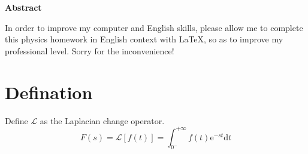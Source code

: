 \documentclass[12pt,a4paper]{article}
\title{\fontsize{18pt}{27pt}\selectfont{\heiti Laplace Transform}}
\author{\fontsize{12pt}{18pt}\selectfont {\fangsong  Sweet Pastry}\\\fontsize{10.5pt}{15.75pt}\selectfont{\fangsong(FDU Physics)}}
\date{}
\begin{document}
	
	\lhead{} 
	\chead{} 
	\rhead{} 
	\lfoot{}
	\cfoot{\thepage} 
	\rfoot{} 
	
	\maketitle
	
	
	
	\begin{center}%
		{\textbf{Abstract}}%
	\end{center}
	\begin{adjustwidth}{1.06cm}{1.06cm}%
		\hspace{1.5em}In order to improve my computer and English skills, please allow me to complete this physics homework in English context with \LaTeX, so as to improve my professional level. Sorry for the inconvenience!
	\end{adjustwidth}
	
	\newpage
	
	\renewcommand{\contentsname}{Contents}
	\tableofcontents
	
	\newpage
	
	\section{Defination}
	Define $\mathcal{L}$ as the Laplacian change operator.
	$$
	F(s)=\mathcal{L}\left[ f(t)\right] =\int_{0^-}^{+\infty}{f\left( t \right) \mathrm{e}^{-st}}\mathrm{d}t
	$$
\end{document}
